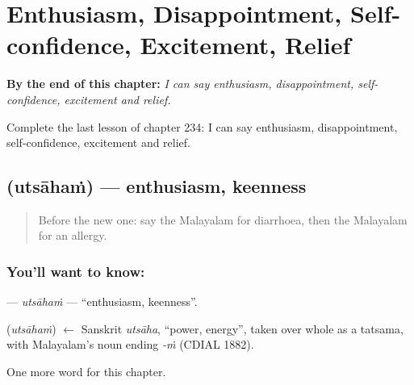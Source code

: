 
\chapter{Enthusiasm, Disappointment, Self-confidence, Excitement, Relief}
\label{ch:ml-enthusiasm-disappointment-self-confidence-excitement-relief}

\begin{chapteropening}
\textbf{By the end of this chapter:} \emph{I can say enthusiasm, disappointment, self-confidence, excitement and relief.}

Complete the last lesson of chapter 234: I can say enthusiasm, disappointment, self-confidence, excitement and relief.
\end{chapteropening}

\section[\texorpdfstring{\ml{ഉത്സാഹം} (utsāhaṁ)}{ഉത്സാഹം (utsāhaṁ)}]{ (utsāhaṁ) — enthusiasm, keenness}

\label{lesson:ML-C234-utsaham}



\begin{quote}
Before the new one: say the Malayalam for diarrhoea, then the Malayalam for an allergy.
\end{quote}

\subsection*{You'll want to know: }
\textbf{} — \emph{utsāhaṁ} — \textquotedblleft{}enthusiasm, keenness\textquotedblright{}.

\begin{cousinweb}
\textbf{} (\emph{utsāhaṁ}) $\leftarrow$ Sanskrit \emph{utsāha}, \textquotedblleft{}power, energy\textquotedblright{}, taken over whole as a tatsama, with Malayalam's noun ending \emph{-ṁ} (CDIAL 1882).
\end{cousinweb}

\begin{grammarlens}[title={What you've built}]
One more word for this chapter.
\end{grammarlens}

